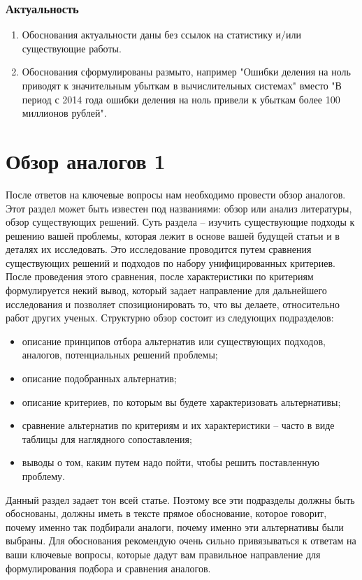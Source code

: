 \documentclass{report}
\begin{document}
\subsubsection{Актуальность}

\begin{enumerate}
	\item Обоснования актуальности даны без ссылок на статистику и/или существующие работы.
	\item Обоснования сформулированы размыто, например "Ошибки деления на ноль приводят к значительным убыткам в вычислительных системах" вместо "В период с 2014 года ошибки деления на ноль привели к убыткам более 100 миллионов рублей". 
\end{enumerate}

\section{Обзор аналогов 1}
После ответов на ключевые вопросы нам необходимо провести обзор аналогов. Этот раздел может быть известен под названиями: обзор или анализ литературы, обзор существующих решений. Суть раздела – изучить существующие подходы к решению вашей проблемы, которая лежит в основе вашей будущей статьи и в деталях их исследовать. Это исследование проводится путем сравнения существующих решений и подходов по набору унифицированных критериев. После проведения этого сравнения, после характеристики по критериям формулируется некий вывод, который задает направление для дальнейшего исследования и позволяет спозиционировать то, что вы делаете, относительно работ других ученых. Структурно обзор состоит из следующих подразделов:

\begin{itemize}
	\item описание принципов отбора альтернатив или существующих подходов, аналогов, потенциальных решений проблемы;
	\item описание подобранных альтернатив;
	\item описание критериев, по которым вы будете характеризовать альтернативы;
	\item сравнение альтернатив по критериям и их характеристики – часто в виде таблицы для наглядного сопоставления;
	\item выводы о том, каким путем надо пойти, чтобы решить поставленную проблему.
\end{itemize}

Данный раздел задает тон всей статье. Поэтому все эти подразделы должны быть обоснованы, должны иметь в тексте прямое обоснование, которое говорит, почему именно так подбирали аналоги, почему именно эти альтернативы были выбраны. Для обоснования рекомендую очень сильно привязываться к ответам на ваши ключевые вопросы, которые дадут вам правильное направление для формулирования подбора и сравнения аналогов.
\end{document}
